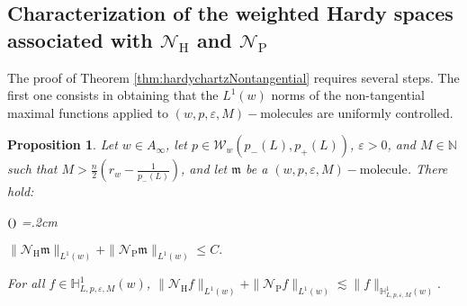 \documentclass[11pt, a4paper,leqno]{amsart}
\newcommand{\mm}{\mathfrak{m}}
\theoremstyle{plain}
\newtheorem{proposition}[equation]{Proposition}
\theoremstyle{definition}
\theoremstyle{remark}
\numberwithin{equation}{section}
\def \N{ \mathbb{N} }
\def \hh{ \mathrm{H} }
\def \pp{ \mathrm{P} }
\def \Ncal { \mathcal{N} }
\def \mol{ (w,p,\varepsilon,M)-\textrm{molecule}}
\begin{document}
\subsection{Characterization of the weighted Hardy spaces associated with $\Ncal_{\hh}$
and $\Ncal_{\pp}$}

The proof of Theorem \ref{thm:hardychartzNontangential} requires several steps. The first one consists in obtaining that the $L^1(w)$ norms of the non-tangential maximal functions applied to $\mol$s are uniformly controlled.


\begin{proposition}\label{prop:contro-mol-NT}
Let $w\in A_{\infty}$, let $p\in \mathcal{W}_w(p_-(L),p_+(L))$, $\varepsilon>0$, and $M\in \N$ such that $M>\frac{n}{2}\left(r_w-\frac{1}{p_-(L)}\right)$, and let $\mm$ be a $\mol$. There hold:
\begin{list}{$(\theenumi)$}{\leftmargin=1cm \itemsep=0.2cm\topsep=.2cm \renewcommand{\theenumi}{\alph{enumi}}}
\item $
\|\Ncal_{\hh}\mm\|_{L^1(w)}+\|\Ncal_{\pp}\mm\|_{L^1(w)}\leq C.
$

\item For all $f\in \mathbb{H}_{L,p,\varepsilon,M}^1(w)$, 
$
\|\Ncal_{\hh}f\|_{L^1(w)}+\|\Ncal_{\pp}f\|_{L^1(w)}\lesssim \|f\|_{\mathbb{H}_{L,p,\varepsilon,M}^1(w)}.
$

\end{list}

\end{proposition}
\end{document}
